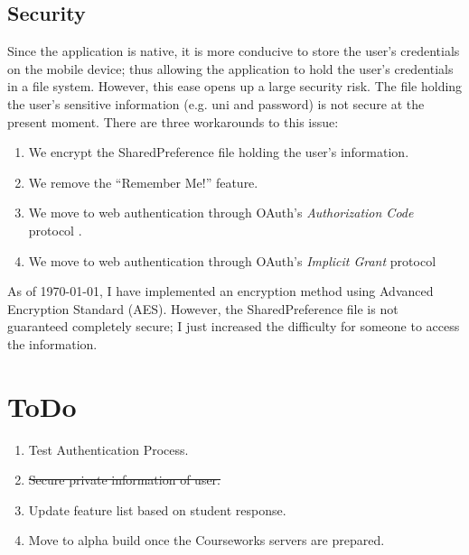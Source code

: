 \documentclass{article}
\begin{document}
\subsection{Security}
Since the application is native, it is more conducive to store the user's credentials on 
the mobile device; thus allowing the application to hold the user's credentials in a file 
system. However, this ease opens up a large security risk. The file holding the user's 
sensitive information (e.g. uni and password) is not secure at the present moment. There 
are three workarounds to this issue:
 \begin{enumerate}
    \item We encrypt the SharedPreference file holding the user's information.
    \item We remove the ``Remember Me!'' feature.
    \item We move to web authentication through OAuth's \emph{Authorization Code} protocol
          .
    \item We move to web authentication through OAuth's \emph{Implicit Grant} protocol
\end{enumerate}
As of \today, I have implemented an encryption method using Advanced Encryption Standard (AES). However, the SharedPreference file is not guaranteed completely secure; I just increased the difficulty for someone to access the information.

\section{ToDo}
\begin{enumerate}
    \item Test Authentication Process.
    \item \st{Secure private information of user.}
    \item Update feature list based on student response.
    \item Move to alpha build once the Courseworks servers are prepared.
\end{enumerate}
\end{document}

